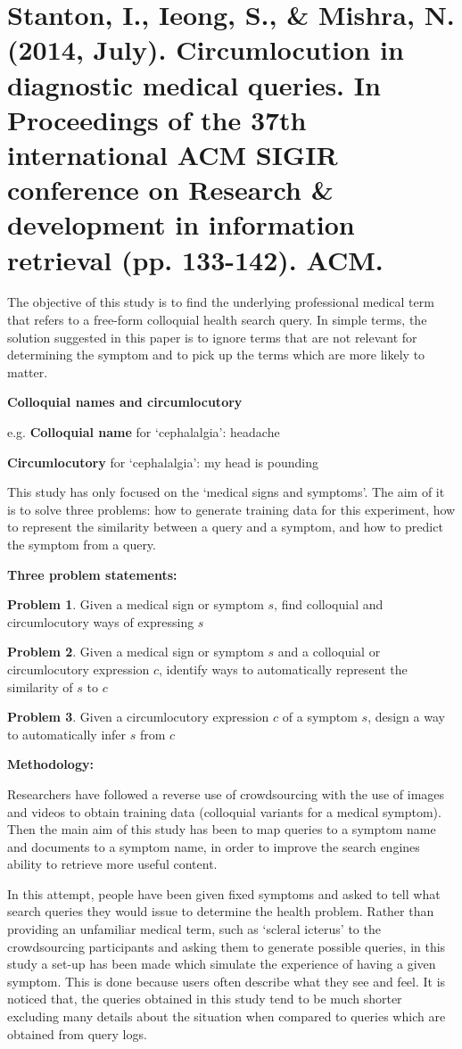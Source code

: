 \documentclass[]{article}
\begin{document}
\section{Stanton, I., Ieong, S., \& Mishra, N. (2014, July). Circumlocution in diagnostic medical queries. In Proceedings of the 37th international ACM SIGIR conference on Research \& development in information retrieval (pp. 133-142). ACM.}


The objective of this study is to find the underlying professional medical term that refers to a free-form colloquial health search query. In simple terms, the solution suggested in this paper is to ignore terms that are not relevant for determining the symptom and to pick up the terms which are more likely to matter.

\textbf{Colloquial names and circumlocutory  }
 
e.g. \textbf{Colloquial name} for ‘cephalalgia’: headache

\textbf{Circumlocutory} for ‘cephalalgia’: my head is pounding

This study has only focused on the ‘medical signs and symptoms’. The aim of it is to solve three problems: how to generate training data for this experiment, how to represent the similarity between a query and a symptom, and how to predict the symptom from a query. 
 
\textbf{Three problem statements:}

\textbf{Problem 1}. Given a medical sign or symptom $s$, find colloquial and circumlocutory ways of expressing $s$

\textbf{Problem 2}. Given a medical sign or symptom $s$ and a colloquial or circumlocutory expression $c$, identify ways to automatically represent the similarity of $s$ to $c$

\textbf{Problem 3}. Given a circumlocutory expression $c$ of a symptom $s$, design a way to automatically infer $s$ from $c$  

\textbf{Methodology:} 

Researchers have followed a reverse use of crowdsourcing with the use of images and videos to obtain training data (colloquial variants for a medical symptom). Then the main aim of this study has been to map queries to a symptom name and documents to a symptom name, in order to improve the search engines ability to retrieve more useful content. 

In this attempt, people have been given fixed symptoms and asked to tell what search queries they would issue to determine the health problem. Rather than providing an unfamiliar medical term, such as ‘scleral icterus’ to the crowdsourcing participants and asking them to generate possible queries, in this study a set-up has been made which simulate the experience of having a given symptom. This is done because users often describe what they see and feel. It is noticed that, the queries obtained in this study tend to be much shorter excluding many details about the situation when compared to queries which are obtained from query logs. 
\end{document}
